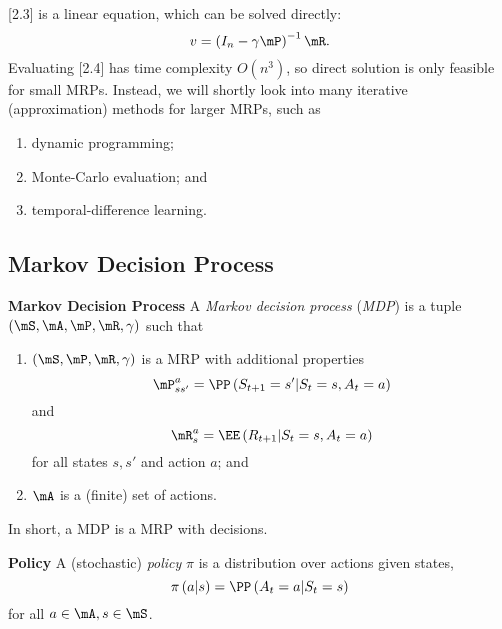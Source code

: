 \documentclass[RL]{subfiles}
\begin{document}
    [2.3] is a linear equation, which can be solved directly:
    \begin{equation}
        v = \left( I_n-\gamma\mP \right)^{-1}\mR.
    \end{equation}
    Evaluating [2.4] has time complexity $O\left( n^{3} \right)$, so direct solution is only feasible for small MRPs. Instead, we will shortly look into many iterative (approximation) methods for larger MRPs, such as
    \begin{enumerate}
        \item dynamic programming;
        \item Monte-Carlo evaluation; and
        \item temporal-difference learning.
    \end{enumerate}
    
    \clearpage
    \subsection{Markov Decision Process}
    
    \begin{definition}{\textbf{Markov Decision Process}}
        A \emph{Markov decision process} (\emph{MDP}) is a tuple $\left( \mS,\mA,\mP,\mR,\gamma \right)$ such that
        \begin{enumerate}
            \item $\left( \mS,\mP,\mR,\gamma \right)$ is a MRP with additional properties
                \begin{equation*}
                    \mP_{ss'}^a = \PP\left( S_{t+1}=s'|S_t=s, A_t=a \right)
                \end{equation*}
                and
                \begin{equation*}
                    \mR^a_{s} = \EE\left( R_{t+1}|S_t=s, A_t=a \right)
                \end{equation*}
                for all states $s,s'$ and action $a$; and
            \item $\mA$ is a (finite) set of actions.
        \end{enumerate}
    \end{definition}

    In short, a MDP is a MRP with decisions.

    \begin{definition}{\textbf{Policy}}
        A (stochastic) \emph{policy} $\pi$ is a distribution over actions given states,
        \begin{equation*}
            \pi\left( a|s \right) = \PP\left( A_t=a|S_t=s \right)
        \end{equation*}
        for all $a\in\mA,s\in\mS$.
    \end{definition}
\end{document}
